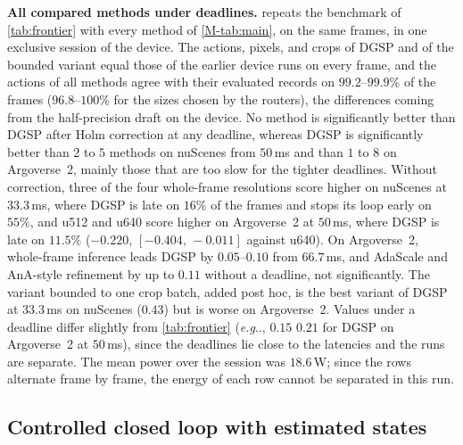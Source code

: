\documentclass[10pt,letterpaper]{article}
\makeatletter
\DeclareRobustCommand\onedot{\futurelet\@let@token\@onedot}
\def\@onedot{\ifx\@let@token.\else.\null\fi\xspace}
\def\eg{\emph{e.g}\onedot} \def\Eg{\emph{E.g}\onedot}
\newcommand{\method}{DGSP\xspace}
\newcommand{\ci}[2]{[#1,\allowbreak\,#2]}
\theoremstyle{remark}
\theoremstyle{plain}
\theoremstyle{definition}
\makeatother
\begin{document}
\noindent\textbf{All compared methods under deadlines.}
 repeats the benchmark of \cref{tab:frontier} with every method of \cref*{M-tab:main}, on the same frames, in one exclusive session of the device.
The actions, pixels, and crops of \method and of the bounded variant equal those of the earlier device runs on every frame, and the actions of all methods agree with their evaluated records on $99.2$--$99.9\%$ of the frames ($96.8$--$100\%$ for the sizes chosen by the routers), the differences coming from the half-precision draft on the device.
No method is significantly better than \method after Holm correction at any deadline, whereas \method is significantly better than $2$ to $5$ methods on nuScenes from $50$\,ms and than $1$ to $8$ on Argoverse~2, mainly those that are too slow for the tighter deadlines.
Without correction, three of the four whole-frame resolutions score higher on nuScenes at $33.3$\,ms, where \method is late on $16\%$ of the frames and stops its loop early on $55\%$, and u512 and u640 score higher on Argoverse~2 at $50$\,ms, where \method is late on $11.5\%$ ($-0.220$, $\ci{-0.404}{-0.011}$ against u640).
On Argoverse~2, whole-frame inference leads \method by $0.05$--$0.10$ from $66.7$\,ms, and AdaScale and AnA-style refinement by up to $0.11$ without a deadline, not significantly.
The variant bounded to one crop batch, added post hoc, is the best variant of \method at $33.3$\,ms on nuScenes ($0.43$) but is worse on Argoverse~2.
Values under a deadline differ slightly from \cref{tab:frontier} (\eg, $0.15$ \vs $0.21$ for \method on Argoverse~2 at $50$\,ms), since the deadlines lie close to the latencies and the runs are separate.
The mean power over the session was $18.6$\,W; since the rows alternate frame by frame, the energy of each row cannot be separated in this run.

\subsection{Controlled closed loop with estimated states}
\label{sec:supp_aeb}
\end{document}
